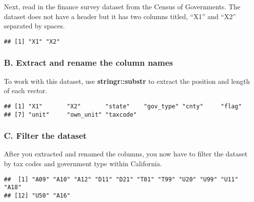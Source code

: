 \documentclass[]{article}
\newenvironment{Shaded}{\begin{snugshade}}{\end{snugshade}}
\newcommand{\KeywordTok}[1]{\textcolor[rgb]{0.13,0.29,0.53}{\textbf{#1}}}
\newcommand{\StringTok}[1]{\textcolor[rgb]{0.31,0.60,0.02}{#1}}
\newcommand{\CommentTok}[1]{\textcolor[rgb]{0.56,0.35,0.01}{\textit{#1}}}
\newcommand{\OperatorTok}[1]{\textcolor[rgb]{0.81,0.36,0.00}{\textbf{#1}}}
\newcommand{\NormalTok}[1]{#1}
\begin{document}
Next, read in the finance survey dataset from the Census of Governments.
The dataset does not have a header but it has two columns titled, ``X1''
and ``X2'' separated by spaces.

\begin{verbatim}
## [1] "X1" "X2"
\end{verbatim}

\subsubsection{B. Extract and rename the column
names}\label{b.-extract-and-rename-the-column-names}

To work with this dataset, use \textbf{stringr::substr} to extract the
position and length of each vector.

\begin{verbatim}
## [1] "X1"       "X2"       "state"    "gov_type" "cnty"     "flag"    
## [7] "unit"     "own_unit" "taxcode"
\end{verbatim}

\subsubsection{C. Filter the dataset}\label{c.-filter-the-dataset}

After you extracted and renamed the columns, you now have to filter the
dataset by tax codes and government type within California.

\begin{Shaded}
\end{Shaded}

\begin{verbatim}
##  [1] "A09" "A10" "A12" "D11" "D21" "T01" "T99" "U20" "U99" "U11" "A18"
## [12] "U50" "A16"
\end{verbatim}
\end{document}
